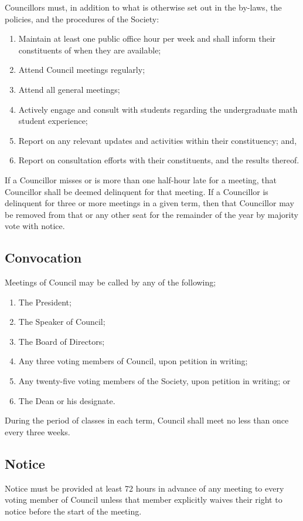 Councillors must, in addition to what is otherwise set out in the by-laws,
the policies, and the procedures of the Society:
\begin{enumerate}
    \item Maintain at least one public office hour per week and shall inform
        their constituents of when they are available; 
    \item Attend Council meetings regularly; 
    \item Attend all general meetings;
    \item Actively engage and consult with students regarding the undergraduate
        math student experience;
    \item Report on any relevant updates and activities within their
        constituency; and,
    \item Report on consultation efforts with their constituents, and the
        results thereof.
\end{enumerate}

If a Councillor misses or is more than one half-hour late for a meeting, that
Councillor shall be deemed delinquent for that meeting. If a Councillor is
delinquent for three or more meetings in a given term, then that Councillor may
be removed from that or any other seat for the remainder of the year by
majority vote with notice.

\subsection{Convocation}
Meetings of Council may be called by any of the following;
\begin{enumerate}
  \item The President;
  \item The Speaker of Council;
  \item The Board of Directors;
  \item Any three voting members of Council, upon petition in writing;
  \item Any twenty-five voting members of the Society, upon petition in writing;
    or
  \item The Dean or his designate.
\end{enumerate}

During the period of classes in each term, Council shall meet no less
than once every three weeks.

\subsection{Notice}
Notice must be provided at least 72 hours in advance of any meeting to every
voting member of Council unless that member explicitly waives their
right to notice before the start of the meeting.

